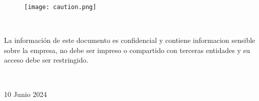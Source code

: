 \documentclass[a4paper]{article}
\newcommand{\FechaDocumento}{10 Junio 2024}
\begin{document}
    \begin{figure}
        \centering
        \null\par\vspace{2cm}
        \texttt{[image: caution.png]}
    \end{figure}
    
    \null\par\vspace{2cm}
    \vfill\
    \begin{center} 
        \begin{tcolorbox}[colback=red!5!white, colframe=red!90!black]
            \centering
            \Large La información de este documento es confidencial y contiene informacion sensible sobre la empresa, no debe ser impreso o compartido con terceras entidades y su acceso debe ser restringido. 
            
        \end{tcolorbox}
    \vfill\    
        \par\vspace{0.7cm}
        \large \FechaDocumento
    \end{center}
\end{document}
